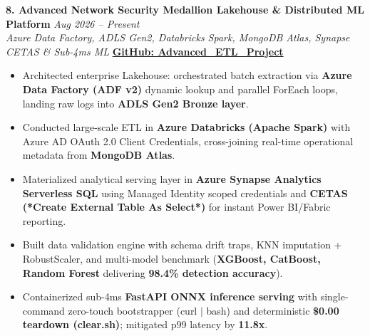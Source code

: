 \documentclass[9.5pt,a4paper]{article}
\begin{document}
\vspace{2.0pt}
\noindent\textbf{8. Advanced Network Security Medallion Lakehouse \& Distributed ML Platform} \hfill {\small\textit{Aug 2026 -- Present}}\\
\textit{Azure Data Factory, ADLS Gen2, Databricks Spark, MongoDB Atlas, Synapse CETAS \& Sub-4ms ML} \hfill {\footnotesize\href{https://github.com/KishorKumarParoi/Advanced_ETL_Project}{\textbf{GitHub: Advanced\_ETL\_Project}}}
\begin{itemize}
    \item Architected enterprise Lakehouse: orchestrated batch extraction via \textbf{Azure Data Factory (ADF v2)} dynamic lookup and parallel ForEach loops, landing raw logs into \textbf{ADLS Gen2 Bronze layer}.
    \item Conducted large-scale ETL in \textbf{Azure Databricks (Apache Spark)} with Azure AD OAuth 2.0 Client Credentials, cross-joining real-time operational metadata from \textbf{MongoDB Atlas}.
    \item Materialized analytical serving layer in \textbf{Azure Synapse Analytics Serverless SQL} using Managed Identity scoped credentials and \textbf{CETAS (*Create External Table As Select*)} for instant Power BI/Fabric reporting.
    \item Built data validation engine with schema drift traps, KNN imputation + RobustScaler, and multi-model benchmark (\textbf{XGBoost, CatBoost, Random Forest} delivering \textbf{98.4\% detection accuracy}).
    \item Containerized sub-4ms \textbf{FastAPI ONNX inference serving} with single-command zero-touch bootstrapper (curl $\vert$ bash) and deterministic \textbf{\$0.00 teardown (clear.sh)}; mitigated p99 latency by \textbf{11.8x}.
\end{itemize}
\end{document}
